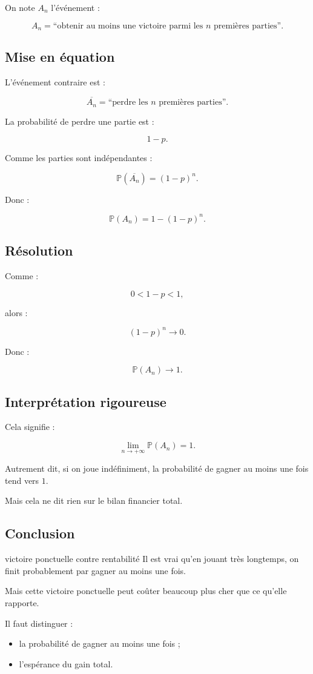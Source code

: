 \documentclass[11pt,a4paper]{article}
\newcommand{\Prob}{\mathbb{P}}
\begin{document}
On note $A_n$ l'événement :

\[
A_n=\text{``obtenir au moins une victoire parmi les }n\text{ premières parties''}.
\]

\subsection{Mise en équation}

L'événement contraire est :

\[
\overline{A_n}=\text{``perdre les }n\text{ premières parties''}.
\]

La probabilité de perdre une partie est :

\[
1-p.
\]

Comme les parties sont indépendantes :

\[
\Prob(\overline{A_n})=(1-p)^n.
\]

Donc :

\[
\Prob(A_n)=1-(1-p)^n.
\]

\subsection{Résolution}

Comme :

\[
0<1-p<1,
\]

alors :

\[
(1-p)^n\to 0.
\]

Donc :

\[
\Prob(A_n)\to 1.
\]

\subsection{Interprétation rigoureuse}

Cela signifie :

\[
\lim_{n\to+\infty}\Prob(A_n)=1.
\]

Autrement dit, si on joue indéfiniment, la probabilité de gagner au moins une fois tend vers $1$.

Mais cela ne dit rien sur le bilan financier total.

\subsection{Conclusion}

\begin{conclusionbox}{victoire ponctuelle contre rentabilité}
Il est vrai qu'en jouant très longtemps, on finit probablement par gagner au moins une fois.

Mais cette victoire ponctuelle peut coûter beaucoup plus cher que ce qu'elle rapporte.

Il faut distinguer :
\begin{itemize}
    \item la probabilité de gagner au moins une fois ;
    \item l'espérance du gain total.
\end{itemize}
\end{conclusionbox}
\end{document}
